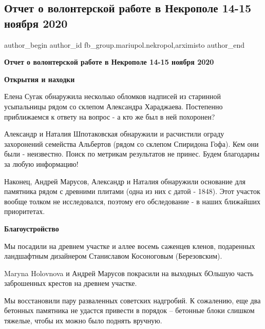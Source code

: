  
 
 
 
 

\subsection{Отчет о волонтерской работе в Некрополе 14-15 ноября 2020}
\label{sec:21_11_2020.fb.fb_group.mariupol.nekropol.1.otchet_volonter_rabota_14_15_nojabrja_2020}
 
\ifcmt
 author_begin
   author_id fb_group.mariupol.nekropol,arximisto
 author_end
\fi

\textbf{Отчет о волонтерской работе в Некрополе 14-15 ноября 2020}

\textbf{Открытия и находки}

Елена Сугак обнаружила несколько обломков надписей из старинной усыпальницы
рядом со склепом Александра Хараджаева. Постепенно приближаемся к ответу на
вопрос - а кто же был в ней похоронен?

Александр и Наталия Шпотаковская обнаружили и расчистили ограду захоронений
семейства Альбертов (рядом со склепом Спиридона Гофа). Кем они были -
неизвестно. Поиск по метрикам результатов не принес. Будем благодарны за любую
информацию!

Наконец, Андрей Марусов, Александр и Наталия обнаружили основание для памятника
рядом с древними плитами (одна из них с датой - 1848). Этот участок вообще
толком не исследовался, поэтому его обследование - в наших ближайших
приоритетах.

\textbf{Благоустройство}

Мы посадили на древнем участке и аллее восемь саженцев кленов, подаренных
ландшафтным дизайнером Станиславом Косоноговым (Березовским).

Maryna Holovnova и Андрей Марусов покрасили на выходных бОльшую часть
заброшенных крестов на древнем участке.

Мы восстановили пару разваленных советских надгробий. К сожалению, еще два
бетонных памятника не удастся привести в порядок – бетонные блоки слишком
тяжелые, чтобы их можно было поднять вручную.

